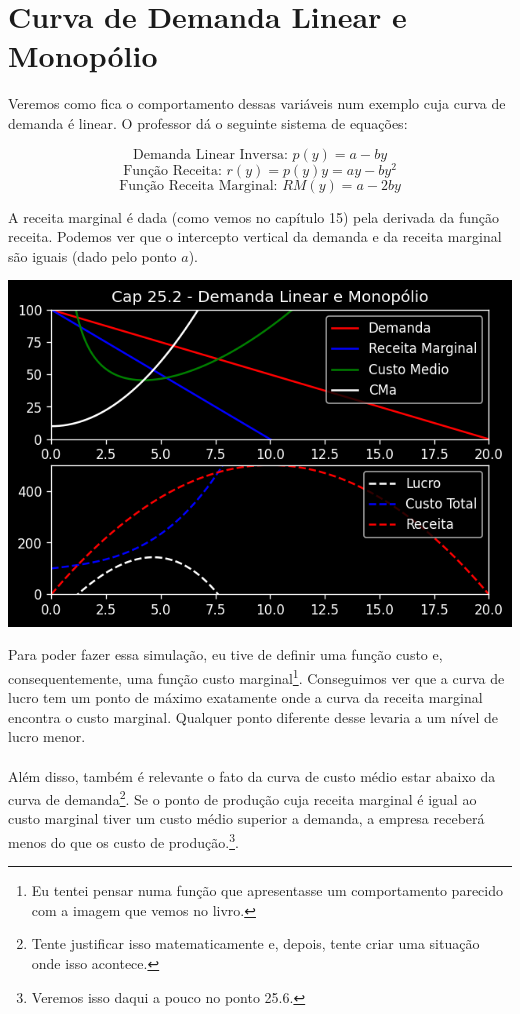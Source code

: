 \documentclass[a4paper,11pt,oneside]{book}
\theoremstyle{definition}
\theoremstyle{break}
\begin{document}
\section{Curva de Demanda Linear e Monopólio}

Veremos como fica o comportamento dessas variáveis num exemplo cuja curva de demanda é linear. O professor dá o seguinte sistema de equações:

$$ \textrm{Demanda Linear Inversa: } p(y) = a - by $$
$$ \textrm{Função Receita: } r(y) = p(y)y = ay - by^2 $$
$$ \textrm{Função Receita Marginal: } RM(y) = a - 2by $$

A receita marginal é dada (como vemos no capítulo 15) pela derivada da função receita. Podemos ver que o intercepto vertical da demanda e da receita marginal são iguais (dado pelo ponto $a$).

\begin{center}
\includegraphics[scale=0.8]{cap25_2-demanda_linear_e_monopolio.png}
\end{center}

Para poder fazer essa simulação, eu tive de definir uma função custo e, consequentemente, uma função custo marginal\footnote{Eu tentei pensar numa função que apresentasse um comportamento parecido com a imagem que vemos no livro.}. Conseguimos ver que a curva de lucro tem um ponto de máximo exatamente onde a curva da receita marginal encontra o custo marginal. Qualquer ponto diferente desse levaria a um nível de lucro menor.
\\~\\
Além disso, também é relevante o fato da curva de custo médio estar abaixo da curva de demanda\footnote{Tente justificar isso matematicamente e, depois, tente criar uma situação onde isso acontece.}. Se o ponto de produção cuja receita marginal é igual ao custo marginal tiver um custo médio superior a demanda, a empresa receberá menos do que os custo de produção.\footnote{Veremos isso daqui a pouco no ponto 25.6.}.
\end{document}
